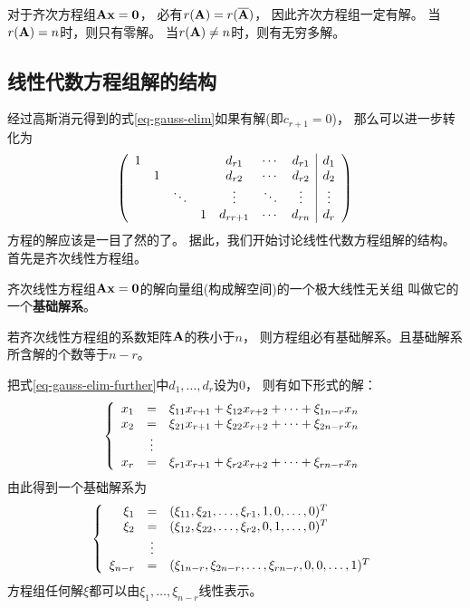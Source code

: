 \begin{remark}
  对于齐次方程组$\mmA\mvx=\mvZero$，
  必有$r(\mmA)=r(\overline{\mmA})$，
  因此齐次方程组一定有解。
  当$r(\mmA)=n$时，则只有零解。
  当$r(\mmA)\neq n$时，则有无穷多解。
\end{remark}

\subsection{线性代数方程组解的结构}
经过高斯消元得到的式\ref{eq-gauss-elim}如果有解(即$c_{r+1}=0$)，
那么可以进一步转化为
\begin{equation} \label{eq-gauss-elim-further}
  \mmat{ccccccc|c}{
    1 &        &        &   & d_{r1}   & \cdots & d_{r1} & d_1    \\
      & 1      &        &   & d_{r2}   & \cdots & d_{r2} & d_2    \\
      &        & \ddots &   & \vdots   & \ddots & \vdots & \vdots \\
      &        &        & 1 & d_{rr+1} & \cdots & d_{rn} & d_r
  }
\end{equation}
方程的解应该是一目了然的了。
据此，我们开始讨论线性代数方程组解的结构。
首先是齐次线性方程组。

\begin{definition}[基础解系]
    齐次线性方程组$\mmA\mvx=\mvZero$的解向量组(构成解空间)的一个极大线性无关组
    叫做它的一个\textbf{基础解系}。
\end{definition}

\begin{theorem}
    若齐次线性方程组的系数矩阵$\mmA$的秩小于$n$，
    则方程组必有基础解系。且基础解系所含解的个数等于$n-r$。
\end{theorem}

\begin{remark}
  把式\ref{eq-gauss-elim-further}中$d_1,\dots,d_r$设为0，
  则有如下形式的解：
  \begin{displaymath}
  \meqs{rcl}{
    x_1 &=& \xi_{11}x_{r+1}+\xi_{12}x_{r+2}+\cdots+\xi_{1n-r}x_{n} \\
    x_2 &=& \xi_{21}x_{r+1}+\xi_{22}x_{r+2}+\cdots+\xi_{2n-r}x_{n} \\
    & \vdots & \\
    x_r &=& \xi_{r1}x_{r+1}+\xi_{r2}x_{r+2}+\cdots+\xi_{rn-r}x_{n} \\
  }
  \end{displaymath}
  由此得到一个基础解系为
  \begin{displaymath}
  \meqs{rcl} {
    \xi_1 &=& (\xi_{11}, \xi_{21}, \dots, \xi_{r1}, 1, 0, \dots, 0)^T \\
    \xi_2 &=& (\xi_{12}, \xi_{22}, \dots, \xi_{r2}, 0, 1, \dots, 0)^T \\
    & \vdots & \\
    \xi_{n-r} &=& (\xi_{1n-r}, \xi_{2n-r}, \dots, \xi_{rn-r}, 0, 0, \dots, 1)^T
  }
  \end{displaymath}
  方程组任何解$\xi$都可以由$\xi_1,\dots,\xi_{n-r}$线性表示。
\end{remark}

